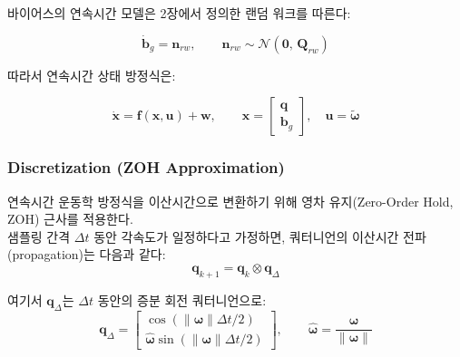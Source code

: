             바이어스의 연속시간 모델은 2장에서 정의한 랜덤 워크를 따른다:

            \begin{equation}
                \dot{\mathbf{b}}_g = \mathbf{n}_{rw}, \qquad \mathbf{n}_{rw} \sim \mathcal{N}(\mathbf{0},\, \mathbf{Q}_{rw})
                \label{eq:bias_dynamics}
            \end{equation}

            따라서 연속시간 상태 방정식은:

            \begin{equation}
                \dot{\mathbf{x}} = \mathbf{f}(\mathbf{x}, \mathbf{u}) + \mathbf{w}, \qquad
                \mathbf{x} = \begin{bmatrix} \mathbf{q} \\ \mathbf{b}_g \end{bmatrix}, \quad
                \mathbf{u} = \tilde{\boldsymbol{\omega}}
                \label{eq:state_equation_cont}
            \end{equation}

        \subsubsection{Discretization (ZOH Approximation)}
            연속시간 운동학 방정식을 이산시간으로 변환하기 위해 영차 유지(Zero-Order Hold, ZOH) 근사를 적용한다.\\

            샘플링 간격 $\Delta t$ 동안 각속도가 일정하다고 가정하면, 쿼터니언의 이산시간 전파(propagation)는 다음과 같다:\\

            \begin{equation}
                \mathbf{q}_{k+1} = \mathbf{q}_k \otimes \mathbf{q}_{\Delta}
                \label{eq:quat_discrete_prop}
            \end{equation}

            \noindent 여기서 $\mathbf{q}_\Delta$는 $\Delta t$ 동안의 증분 회전 쿼터니언으로:\\

            \begin{equation}
                \mathbf{q}_\Delta = \begin{bmatrix} \cos(\|\boldsymbol{\omega}\|\Delta t / 2) \\ \hat{\boldsymbol{\omega}}\sin(\|\boldsymbol{\omega}\|\Delta t / 2) \end{bmatrix}, \qquad \hat{\boldsymbol{\omega}} = \frac{\boldsymbol{\omega}}{\|\boldsymbol{\omega}\|}
                \label{eq:delta_quat}
            \end{equation}

